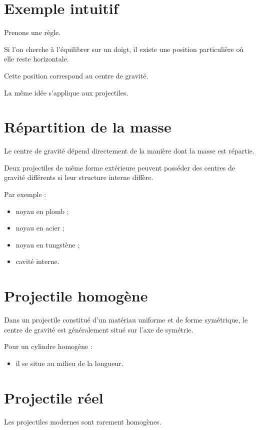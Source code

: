 \section{Exemple intuitif}

Prenons une règle.

Si l'on cherche à l'équilibrer sur un doigt, il existe une position
particulière où elle reste horizontale.

Cette position correspond au centre de gravité.

La même idée s'applique aux projectiles.

\section{Répartition de la masse}

Le centre de gravité dépend directement de la manière dont la masse est
répartie.

Deux projectiles de même forme extérieure peuvent posséder des centres de
gravité différents si leur structure interne diffère.

Par exemple :

\begin{itemize}
    \item noyau en plomb ;
    \item noyau en acier ;
    \item noyau en tungstène ;
    \item cavité interne.
\end{itemize}

\section{Projectile homogène}

Dans un projectile constitué d'un matériau uniforme et de forme symétrique,
le centre de gravité est généralement situé sur l'axe de symétrie.

Pour un cylindre homogène :

\begin{itemize}
    \item il se situe au milieu de la longueur.
\end{itemize}

\section{Projectile réel}

Les projectiles modernes sont rarement homogènes.

